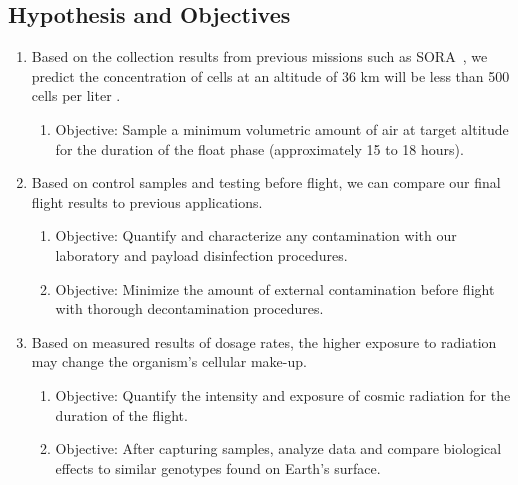 \subsection{Hypothesis and Objectives}
\label{subsec:Hypothesis-Objectives}
\begin{enumerate}
\item Based on the collection results from previous missions such as SORA~\cite{SORA}, we predict the concentration of cells at an altitude of 36 km will be less than 500 cells per liter \citep{LSU}.
  \begin{enumerate}
  \item Objective: Sample a minimum volumetric amount of air at target altitude for the duration of the float phase (approximately 15 to 18 hours).
	\end{enumerate}
\item Based on control samples and testing before flight, we can compare our final flight results to previous applications.
  \begin{enumerate}
  \item Objective: Quantify and characterize any contamination with our laboratory and payload disinfection procedures.
  \item Objective: Minimize the amount of external contamination before flight with thorough decontamination procedures.
  \end{enumerate}
\item Based on measured results of dosage rates, the higher exposure to radiation may change the organism's cellular make-up.
  \begin{enumerate}
  \item Objective: Quantify the intensity and exposure of cosmic radiation for the duration of the flight.
  \item Objective: After capturing samples, analyze data and compare biological effects to similar genotypes found on Earth's surface.
  \end{enumerate}
\end{enumerate}

\vspace*{-0.5cm}
